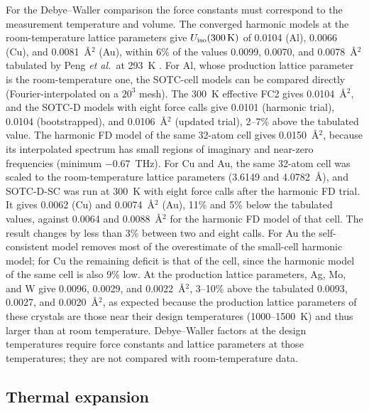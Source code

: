 \documentclass[aip,jap,reprint,amsmath,amssymb,floatfix]{revtex4-2}
\begin{document}
For the Debye--Waller comparison the force constants must correspond to the
measurement temperature and volume. The converged harmonic models at the
room-temperature lattice parameters give $U_{\rm iso}(300\,{\rm K})$ of
0.0104 (Al), 0.0066 (Cu), and 0.0081~\AA$^2$ (Au), within 6\% of the values
0.0099, 0.0070, and 0.0078~\AA$^2$ tabulated by Peng \textit{et al.}\ at
293~K \cite{ref55}. For Al, whose production lattice parameter is the
room-temperature one, the SOTC-cell models can be compared directly
(Fourier-interpolated on a $20^3$ mesh). The 300~K effective FC2 gives
0.0104~\AA$^2$, and the SOTC-D models with eight force calls give 0.0101
(harmonic trial), 0.0104 (bootstrapped), and 0.0106~\AA$^2$ (updated trial),
2--7\% above the tabulated value. The harmonic FD model of the same 32-atom cell
gives 0.0150~\AA$^2$, because its interpolated spectrum has small regions of
imaginary and near-zero frequencies (minimum $-0.67$~THz). For Cu and Au,
the same 32-atom cell was scaled to the room-temperature lattice parameters
(3.6149 and 4.0782~\AA), and SOTC-D-SC was run at 300~K with eight force
calls after the harmonic FD trial. It gives 0.0062 (Cu) and
0.0074~\AA$^2$ (Au), 11\% and 5\% below the tabulated values, against 0.0064
and 0.0088~\AA$^2$ for the harmonic FD model of that cell. The result
changes by less than 3\% between two and eight calls. For Au the
self-consistent model removes most of the overestimate of the small-cell
harmonic model; for Cu the remaining deficit is that of the cell, since the
harmonic model of the same cell is also 9\% low. At the production lattice parameters, Ag, Mo, and W give
0.0096, 0.0029, and 0.0022~\AA$^2$, 3--10\% above the tabulated 0.0093,
0.0027, and 0.0020~\AA$^2$, as expected because the production lattice
parameters of these crystals are those near their design temperatures
(1000--1500~K) and thus larger than at room temperature. Debye--Waller factors at the design temperatures
require force constants and lattice parameters at those temperatures; they
are not compared with room-temperature data.



\subsection{Thermal expansion}\label{sec:qha}
\end{document}
